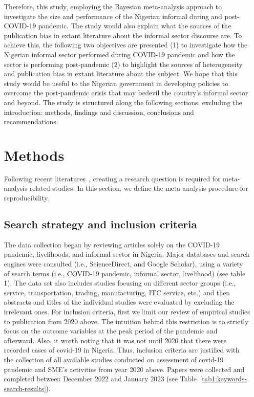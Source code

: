 \documentclass[a4paper, 12pt]{article}
\begin{document}
    Therefore, this study, employing the Bayesian meta-analysis approach to investigate the size and performance of the Nigerian informal during and post-COVID-19 pandemic. The study would also explain what the sources of the publication bias in extant literature about the informal sector discourse are. To achieve this, the following two objectives are presented (1) to investigate how the Nigerian informal sector performed during COVID-19 pandemic and how the sector is performing post-pandemic (2) to highlight the sources of heterogeneity and publication bias in extant literature about the subject. We hope that this study would be useful to the Nigerian government in developing policies to overcome the post-pandemic crisis that may bedevil the country’s informal sector and beyond. The study is structured along the following sections, excluding the introduction: methods, findings and discussion, conclusions and recommendations.


    \section{Methods}\label{sec2:methods}
    Following recent literatures~\parencite{qurat2020meta, mori2020development}, creating a research question is required for meta-analysis related studies. In this section, we define the meta-analysis procedure for reproducibility.

    \subsection{Search strategy and inclusion criteria}\label{subsec2.1:search-strategy-and-inclusion-criteria}
    The data collection began by reviewing articles solely on the COVID-19 pandemic, livelihoods, and informal sector in Nigeria. Major databases and search engines were consulted (i.e., ScienceDirect, and Google Scholar), using a variety of search terms (i.e., COVID-19 pandemic, informal sector, livelihood) (see table 1). The data set also includes studies focusing on different sector groups (i.e., service, transportation, trading, manufacturing, ITC service, etc.) and then abstracts and titles of the individual studies were evaluated by excluding the irrelevant ones. For inclusion criteria, first we limit our review of empirical studies to publication from 2020 above. The intuition behind this restriction is to strictly focus on the outcome variables at the peak period of the pandemic and afterward. Also, it worth noting that it was not until 2020 that there were recorded cases of covid-19 in Nigeria. Thus, inclusion criteria are justified with the collection of all available studies conducted on assessment of covid-19 pandemic and SME’s activities from year 2020 above. Papers were collected and completed between December 2022 and January 2023 (see Table~\ref{tab1:keywords-search-results}).
\end{document}
